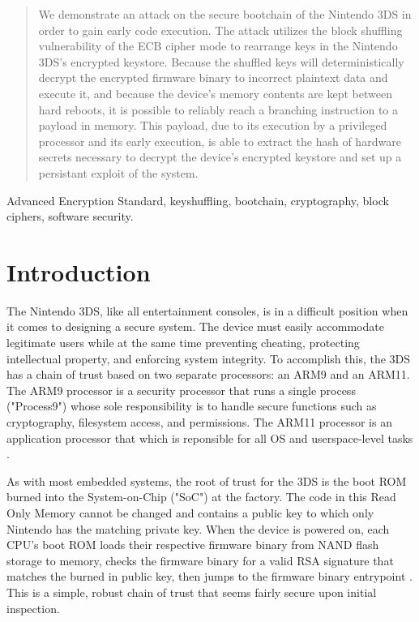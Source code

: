 \documentclass[journal]{IEEEtran}
\begin{document}
\begin{abstract}
We demonstrate an attack on the secure bootchain of the Nintendo 3DS in order to
gain early code execution. The attack utilizes the block shuffling vulnerability
of the ECB cipher mode to rearrange keys in the Nintendo 3DS's encrypted
keystore. Because the shuffled keys will deterministically decrypt the encrypted
firmware binary to incorrect plaintext data and execute it, and because the
device's memory contents are kept between hard reboots, it is possible to
reliably reach a branching instruction to a payload in memory. This payload, due
to its execution by a privileged processor and its early execution, is able to
extract the hash of hardware secrets necessary to decrypt the device's encrypted
keystore and set up a persistant exploit of the system.
\end{abstract}

\begin{IEEEkeywords}
Advanced Encryption Standard, keyshuffling, bootchain, cryptography, block
ciphers, software security.
\end{IEEEkeywords}

\section{Introduction}

The Nintendo 3DS, like all entertainment consoles, is in a difficult position
when it comes to designing a secure system. The device must easily accommodate
legitimate users while at the same time preventing cheating, protecting
intellectual property, and enforcing system integrity. To accomplish this, the
3DS has a chain of trust based on two separate processors: an ARM9 and an ARM11.
The ARM9 processor is a security processor that runs a single process
("Process9") whose sole responsibility is to handle secure functions such as
cryptography, filesystem access, and permissions. The ARM11 processor is an
application processor that which is reponsible for all OS and userspace-level
tasks \cite{cryptosystem}.

As with most embedded systems, the root of trust for the 3DS is the boot ROM
burned into the System-on-Chip ("SoC") at the factory. The code in this Read
Only Memory cannot be changed and contains a public key to which only Nintendo
has the matching private key. When the device is powered on, each CPU's boot ROM
loads their respective firmware binary from NAND flash storage to memory, checks
the firmware binary for a valid RSA signature that matches the burned in public
key, then jumps to the firmware binary entrypoint \cite{cryptosystem}. This is a
simple, robust chain of trust that seems fairly secure upon initial inspection.
\end{document}
